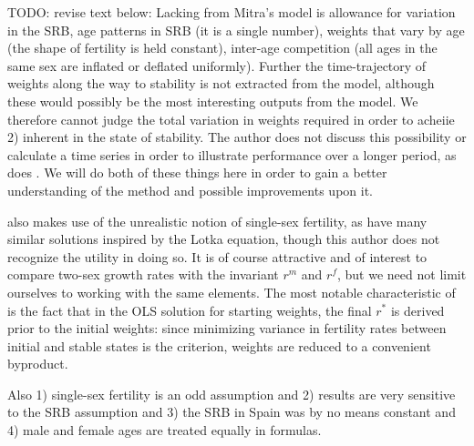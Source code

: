 TODO: revise text below:
Lacking from Mitra's model is allowance for variation in the SRB, age patterns
in SRB (it is a single number), weights that vary by age (the shape of
fertility is held constant), inter-age competition (all ages in the same sex are
inflated or deflated uniformly). Further the time-trajectory of weights along
the way to stability is not extracted from the model, although these would
possibly be the most interesting outputs from the model. We therefore cannot
judge the total variation in weights required in order to acheiie 2) inherent in
the state of stability. The author does not discuss this possibility or
calculate a time series in order to illustrate performance over a longer 
period, as does \citet{gupta1973, gupta1978general}. We will do both of these
things here in order to gain a better understanding of the method and possible
improvements upon it.

\citet{mitra1978derivation} also makes use of the unrealistic
notion of single-sex fertility, as have many similar solutions inspired by the
Lotka equation, though this author does not recognize the utility in doing so.
It is of course attractive and of interest to compare two-sex growth rates with the invariant $r^m$ and $r^f$, but
we need not limit ourselves to working with the same elements. The most notable
characteristic of \citep{mitra1978derivation} is the fact that in the OLS
solution for starting weights, the final $r^\ast$ is derived prior to the initial weights: since
minimizing variance in fertility rates between initial and stable states is the
criterion, weights are reduced to a convenient byproduct.

Also 1) single-sex fertility is an odd assumption and 2) results are very
sensitive to the SRB assumption and 3) the SRB in Spain was by no means constant
and 4) male and female ages are treated equally in formulas.





